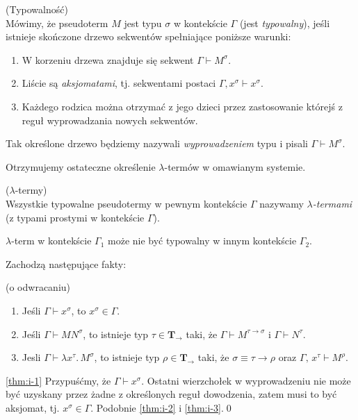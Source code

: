 \begin{definicja}(Typowalność)\\
  Mówimy, że pseudoterm \(M\) jest typu \(\sigma\) w kontekście \(\Gamma\) (jest \emph{typowalny}), jeśli istnieje skończone drzewo sekwentów spełniające poniższe warunki:
  \begin{enumerate}[label=P\arabic*.]
      \item W korzeniu drzewa znajduje się sekwent \(\Gamma \vdash M^\sigma\).
      \item Liście są \emph{aksjomatami}, tj. sekwentami postaci \(\Gamma, x^\sigma \vdash x^\sigma\).
      \item Każdego rodzica można otrzymać z jego dzieci przez zastosowanie którejś z reguł wyprowadzania nowych sekwentów.
  \end{enumerate}
  Tak określone drzewo będziemy nazywali \emph{wyprowadzeniem} typu i pisali \(\Gamma \vdash M^\sigma\).

Otrzymujemy ostateczne określenie \(\lambda\)-termów w omawianym systemie.

\begin{definicja}\label{def:lambda-term}(\(\lambda\)-termy)\\
   Wszystkie typowalne pseudotermy w pewnym kontekście \(\Gamma\) nazywamy \emph{\(\lambda\)-termami} (z typami prostymi w  kontekście \(\Gamma\)).
  \begin{uwaga*}
\(\lambda\)-term w kontekście \(\Gamma_1\) może nie być typowalny w innym kontekście \(\Gamma_2\).
  \end{uwaga*}
\end{definicja}

  Zachodzą następujące fakty:
  \begin{fakt}(o odwracaniu)
  \begin{enumerate}[label=I\arabic*.]
    \item Jeśli \(\Gamma \vdash x^\sigma\), to \(x^\sigma\in\Gamma\).\label{thm:i-1}
    \item Jeśli \(\Gamma \vdash MN^\sigma\), to istnieje typ \(\tau\in\mathbf{T_\to}\) taki, że
          \(\Gamma\vdash M^{\tau\to\sigma}\) i \(\Gamma\vdash N^\tau\).\label{thm:i-2}
    \item Jesli \(\Gamma \vdash \lambda x^\tau .\, M^\sigma\), to istnieje typ \(\rho\in\mathbf{T}_\to\) taki, że
          \(\sigma\equiv \tau\to\rho\) oraz \(\Gamma,\, x^\tau \vdash M^\rho\).\label{thm:i-3}
  \end{enumerate}
  \begin{dowod}
  \ref{thm:i-1} Przypuśćmy, że \(\Gamma\vdash x^\sigma\). Ostatni wierzchołek w wyprowadzeniu nie może być uzyskany przez żadne z określonych reguł dowodzenia, zatem musi to być aksjomat, tj. \(x^\sigma\in\Gamma\). Podobnie \ref{thm:i-2} i \ref{thm:i-3}.\qed
  \end{dowod}
  \end{fakt}


\end{definicja}
